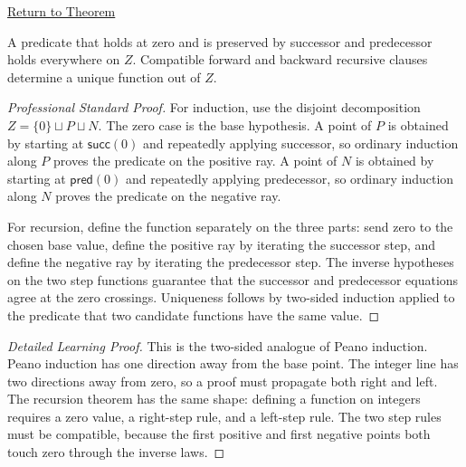 \newpage
{}
\label{prf:two-sided-induction-and-recursion}

\begin{remark*}[Return]
\hyperref[thm:two-sided-induction-and-recursion]{Return to Theorem}
\end{remark*}

\begin{theorem*}
A predicate that holds at zero and is preserved by successor and predecessor
holds everywhere on \(Z\). Compatible forward and backward recursive clauses
determine a unique function out of \(Z\).
\end{theorem*}

\begin{proof}[Professional Standard Proof]
\LRAProofBodyStart
For induction, use the disjoint decomposition
\(Z=\{0\}\sqcup P\sqcup N\). The zero case is the base hypothesis. A point of
\(P\) is obtained by starting at \(\mathsf{succ}(0)\) and repeatedly
applying successor, so ordinary induction along \(P\) proves the predicate on
the positive ray. A point of \(N\) is obtained by starting at
\(\mathsf{pred}(0)\) and repeatedly applying predecessor, so ordinary
induction along \(N\) proves the predicate on the negative ray.

For recursion, define the function separately on the three parts: send zero to
the chosen base value, define the positive ray by iterating the successor
step, and define the negative ray by iterating the predecessor step. The
inverse hypotheses on the two step functions guarantee that the successor and
predecessor equations agree at the zero crossings. Uniqueness follows by
two-sided induction applied to the predicate that two candidate functions have
the same value.
\end{proof}

\begin{proof}[Detailed Learning Proof]
\LRAProofBodyStart
This is the two-sided analogue of Peano induction. Peano induction has one
direction away from the base point. The integer line has two directions away
from zero, so a proof must propagate both right and left. The recursion theorem
has the same shape: defining a function on integers requires a zero value, a
right-step rule, and a left-step rule. The two step rules must be compatible,
because the first positive and first negative points both touch zero through
the inverse laws.
\end{proof}

